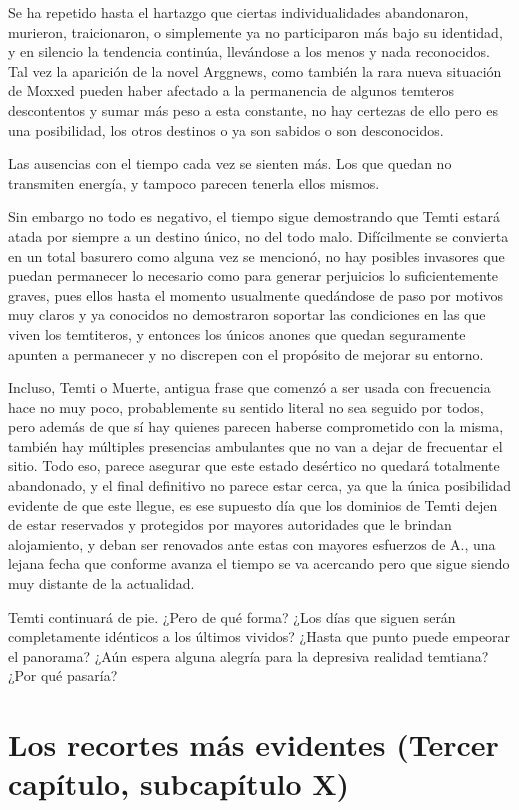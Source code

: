 \documentclass[
  spanish,
]{book}
\begin{document}
Se ha repetido hasta el hartazgo que ciertas individualidades abandonaron, murieron, traicionaron, o simplemente ya no participaron más bajo su identidad, y en silencio la tendencia continúa, llevándose a los menos y nada reconocidos.
Tal vez la aparición de la novel Arggnews, como también la rara nueva situación de Moxxed pueden haber afectado a la permanencia de algunos temteros descontentos y sumar más peso a esta constante, no hay certezas de ello pero es una posibilidad, los otros destinos o ya son sabidos o son desconocidos.

Las ausencias con el tiempo cada vez se sienten más. Los que quedan no transmiten energía, y tampoco parecen tenerla ellos mismos.

Sin embargo no todo es negativo, el tiempo sigue demostrando que Temti estará atada por siempre a un destino único, no del todo malo. Difícilmente se convierta en un total basurero como alguna vez se mencionó, no hay posibles invasores que puedan permanecer lo necesario como para generar perjuicios lo suficientemente graves, pues ellos hasta el momento usualmente quedándose de paso por motivos muy claros y ya conocidos no demostraron soportar las condiciones en las que viven los temtiteros, y entonces los únicos anones que quedan seguramente apunten a permanecer y no discrepen con el propósito de mejorar su entorno.

Incluso, Temti o Muerte, antigua frase que comenzó a ser usada con frecuencia hace no muy poco, probablemente su sentido literal no sea seguido por todos, pero además de que sí hay quienes parecen haberse comprometido con la misma, también hay múltiples presencias ambulantes que no van a dejar de frecuentar el sitio. Todo eso, parece asegurar que este estado desértico no quedará totalmente abandonado, y el final definitivo no parece estar cerca, ya que la única posibilidad evidente de que este llegue, es ese supuesto día que los dominios de Temti dejen de estar reservados y protegidos por mayores autoridades que le brindan alojamiento, y deban ser renovados ante estas con mayores esfuerzos de A., una lejana fecha que conforme avanza el tiempo se va acercando pero que sigue siendo muy distante de la actualidad.

Temti continuará de pie. ¿Pero de qué forma? ¿Los días que siguen serán completamente idénticos a los últimos vividos? ¿Hasta que punto puede empeorar el panorama? ¿Aún espera alguna alegría para la depresiva realidad temtiana? ¿Por qué pasaría?

\hypertarget{los-recortes-muxe1s-evidentes-tercer-capuxedtulo-subcapuxedtulo-x}{%
\section{Los recortes más evidentes (Tercer capítulo, subcapítulo X)}\label{los-recortes-muxe1s-evidentes-tercer-capuxedtulo-subcapuxedtulo-x}}
\end{document}
